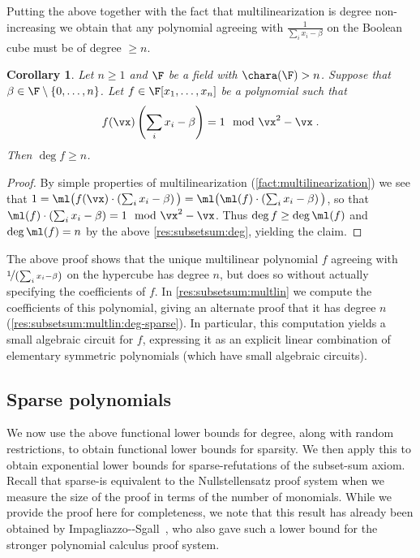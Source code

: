 \documentclass[11pt]{article}
\numberwithin{equation}{section}
\newtheorem{corollary}[theorem]{Corollary}
\theoremstyle{definition}
\theoremstyle{plain}
\begin{document}
Putting the above together with the fact that multilinearization is degree non-increasing we obtain that any polynomial agreeing with $\frac{1}{\sum_i x_i-\beta}$ on the Boolean cube must be of degree $\ge n$.

\begin{corollary}\label{res:subsetsum:deg:ge}
        Let $n\ge 1$ and $\F$ be a field with $\chara(\F)>n$.  Suppose that $\beta\in \F\setminus\{0,\ldots,n\}$. Let $f\in\F[x_1,\ldots,x_n]$ be a polynomial such that
        \[
                f(\vx)\left(\sum_i x_i-\beta\right)=1 \mod \vx^2-\vx
                \;.
        \]
        Then $\deg f\ge n$.
\end{corollary}
\begin{proof}
        By simple properties of multilinearization (\autoref{fact:multilinearization}) we see that $1=\ml\big(f(\vx)\cdot\left(\sum_i x_i-\beta\right)\big)=\ml\big(\ml(f)\cdot\left(\sum_i x_i-\beta\right)\big)$, so that $\ml(f)\cdot \left(\sum_i x_i-\beta\right)=1\mod \vx^2-\vx$.  Thus $\deg f\ge \deg \ml(f)$ and $\deg \ml(f)=n$ by the above \autoref{res:subsetsum:deg}, yielding the claim.
\end{proof}

The above proof shows that the unique multilinear polynomial $f$ agreeing with $\nicefrac{1}{\left(\sum_i x_i-\beta\right)}$ on the hypercube has degree $n$, but does so without actually specifying the coefficients of $f$.  In \autoref{res:subsetsum:multlin} we compute the coefficients of this polynomial, giving an alternate proof that it has degree $n$ (\autoref{res:subsetsum:multlin:deg-sparse}).  In particular, this computation yields a small algebraic circuit for $f$, expressing it as an explicit linear combination of elementary symmetric polynomials (which have small algebraic circuits).

\subsection{Sparse polynomials}\label{sec:h-ips:lbs:sparse}

We now use the above functional lower bounds for degree, along with random restrictions, to obtain functional lower bounds for sparsity.  We then apply this to obtain exponential lower bounds for sparse-\lIPS refutations of the subset-sum axiom.  Recall that sparse-\lIPS is equivalent to the Nullstellensatz proof system when we measure the size of the proof in terms of the number of monomials.  While we provide the proof here for completeness, we note that this result has already been obtained by Impagliazzo-\Pudlak-Sgall~\cite{IPS99}, who also gave such a lower bound for the stronger polynomial calculus proof system.
\end{document}
